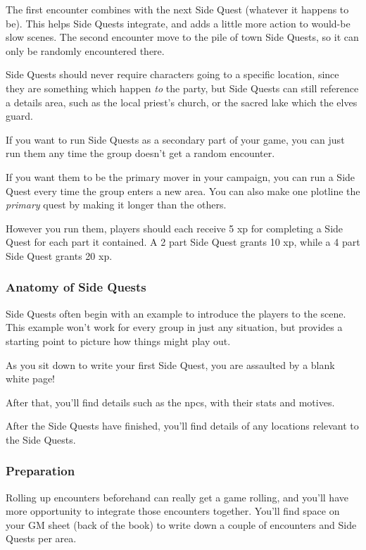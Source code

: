\begin{multicols}{2}
The first encounter combines with the next Side Quest (whatever it happens to be).
This helps Side Quests integrate, and adds a little more action to would-be slow scenes.
The second encounter move to the pile of town Side Quests, so it can only be randomly encountered there.

Side Quests should never require characters going to a specific location, since they are something which happen \emph{to} the party, but Side Quests can still reference a details area, such as the local priest's church, or the sacred lake which the elves guard.

If you want to run Side Quests as a secondary part of your game, you can just run them any time the group doesn't get a random encounter.

If you want them to be the primary mover in your campaign, you can run a Side Quest every time the group enters a new area.
You can also make one plotline the \emph{primary} quest by making it longer than the others.

However you run them, players should each receive 5 \gls{xp} for completing a Side Quest for each part it contained.  A 2 part Side Quest grants 10 \gls{xp}, while a 4 part Side Quest grants 20 \gls{xp}.

\subsubsection{Anatomy of Side Quests}

Side Quests often begin with an example to introduce the players to the scene.
This example won't work for every group in just any situation, but provides a starting point to picture how things might play out.

\begin{boxtext}

	As you sit down to write your first Side Quest, you are assaulted by a blank white page!

\end{boxtext}

After that, you'll find details such as the \glspl{npc}, with their stats and motives.

After the Side Quests have finished, you'll find details of any locations relevant to the Side Quests.

\subsubsection{Preparation}

Rolling up encounters beforehand can really get a game rolling, and you'll have more opportunity to integrate those encounters together.
You'll find space on your GM sheet (back of the book) to write down a couple of encounters and Side Quests per area.

\end{multicols}

